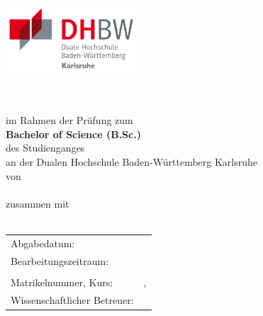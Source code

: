 \thispagestyle{empty}
\begin{titlepage}
\enlargethispage{4cm}

\begin{center}                  
	\includegraphics[height=2.5cm]{Bilder/Logos/Logo_DHBW.pdf} 
\end{center} 
\vspace*{0.1cm}

\begin{center}
	\huge{\textbf{\titel}}\\[1.5cm]
	\Large{\textbf{\arbeit}}\\[0.5cm]
	\normalsize{im Rahmen der Prüfung zum\\[1ex] \textbf{Bachelor of Science (B.Sc.)}}\\[0.5cm]
	\Large{des Studienganges \studiengang}\\[1ex]
	\normalsize{an der Dualen Hochschule Baden-Württemberg Karlsruhe}\\[1cm]
	\normalsize{von}\\[1ex] \Large{\textbf{\autor}} \\[0.5cm] \normalsize{zusammen mit}\\[1ex] \Large{\textbf{\autorWith}} \\[1cm]
\end{center}

\begin{center}
	\vfill
	\begin{tabular}{ll}
		Abgabedatum:                    & \abgabe \\[0.2cm]
		Bearbeitungszeitraum:           & \bearbeitungszeitraum \\[0.2cm]
							            & \bearbeitungszeitraumNd \\[0.2cm]
		Matrikelnummer, Kurs:           & \matrikelnr, \kurs \\ [0.2cm]
		Wissenschaftlicher Betreuer:    & \betreuer \\[1.5cm]
	\end{tabular} 
\end{center}
\end{titlepage}